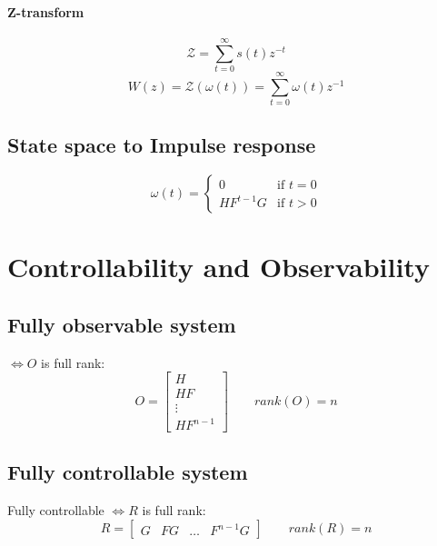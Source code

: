 \documentclass{article}
\begin{document}
\paragraph{Z-transform} 
\[
\mathcal{Z}=\sum_{t=0}^\infty s(t)z^{-t}
\]
\[
W(z)=\mathcal{Z}(\omega(t))=\sum_{t=0}^\infty \omega(t)z^{-1}
\]

\subsection{State space to Impulse response}
\[
\omega(t)=
\begin{cases}
0 & \text{if } t=0\\
HF^{t-1}G & \text{if } t>0
\end{cases}
\]

\section{Controllability and Observability}

\subsection{Fully observable system} $\iff O$ is full rank:
\[
O=\begin{bmatrix}
H\\HF\\\vdots\\HF^{n-1}
\end{bmatrix}
\qquad
rank(O)=n
\]
\subsection{Fully controllable system} Fully controllable $\iff R$ is full rank:
\[
R=\begin{bmatrix}
G&FG&\dots&F^{n-1}G
\end{bmatrix}
\qquad
rank(R)=n
\]
\end{document}
